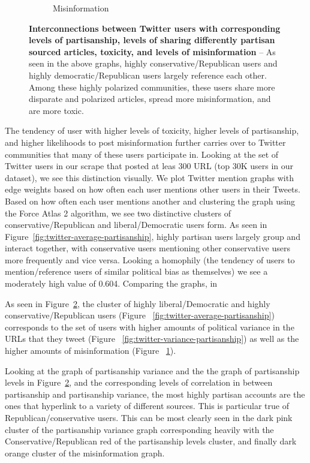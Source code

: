 \begin{figure}
\begin{subfigure}{.24\textwidth}
  \caption{Misinformation }
  \label{fig:twitter-misinformation}
\end{subfigure}
\vspace{5pt}
\caption{\textbf{Interconnections between Twitter users with corresponding levels of partisanship, levels of sharing differently partisan sourced articles, toxicity, and levels of misinformation }-- As seen in the above graphs, highly conservative/Republican users and highly democratic/Republican users largely reference each other. Among these highly polarized communities, these users share more disparate and polarized articles, spread more misinformation, and are more toxic.
}
\label{fig:graph-correlations}
\end{figure}

The tendency of user with higher levels of toxicity, higher levels of partisanship, and higher likelihoods to post misinformation further carries over to Twitter communities that many of these users participate in. Looking at the set of Twitter users in our scrape that posted at leas 300 URL (top 30K users in our dataset), we see this distinction visually. We plot Twitter mention graphs with edge weights based on how often each user mentions other users in their Tweets. Based on how often each user mentions another and clustering the graph using the Force Atlas 2 algorithm, we see two distinctive clusters of conservative/Republican and liberal/Democratic users form. As seen in Figure~\ref{fig:twitter-average-partisanship}, highly partisan users largely group and interact together, with conservative users mentioning other conservative users more frequently and vice versa. Looking a homophily (the tendency of users to mention/reference users of similar political bias as themselves) we see a moderately high value of 0.604. Comparing the graphs, in


As seen in Figure~\ref{fig:graph-correlations}, the cluster of highly liberal/Democratic and highly conservative/Republican users (Figure ~\ref{fig:twitter-average-partisanship}) corresponds to the set of users with higher amounts of political variance in the URLs that they tweet (Figure ~\ref{fig:twitter-variance-partisanship}) as well as the higher amounts of misinformation (Figure ~\ref{fig:twitter-misinformation}).

Looking at the graph of partisanship variance and the the graph of partisanship levels in Figure~\ref{fig:graph-correlations}, and the corresponding levels of correlation in between partisanship and partisanship variance, the most highly partisan accounts are the ones that hyperlink to a variety of different sources. This is particular true of Republican/conservative users. This can be most clearly seen in the dark pink cluster of the partisanship variance graph corresponding heavily with the Conservative/Republican red of the partisanship levels cluster, and finally dark orange cluster of the misinformation graph. 
